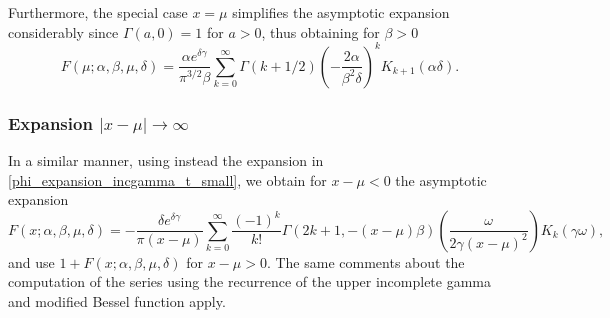 \documentclass[10pt,a4paper,oneside]{article}
\numberwithin{equation}{section}
\begin{document}
Furthermore, the special case $x=\mu$ simplifies the asymptotic expansion considerably since $\Gamma(a, 0) = 1$ for $a > 0$, thus obtaining for $\beta > 0$
\begin{equation}\label{expansion_x_eq_mu_large_delta}
F(\mu; \alpha, \beta, \mu, \delta) = \frac{\alpha e^{\delta \gamma}}{\pi^{3/2} \beta}\sum_{k=0}^{\infty}\Gamma(k + 1/2)\left(-\frac{2\alpha}{\beta^2 \delta}\right)^k K_{k+1}(\alpha \delta).
\end{equation}

\subsubsection{Expansion $|x-\mu| \to \infty$}

In a similar manner, using instead the expansion in \eqref{phi_expansion_incgamma_t_small}, we obtain for $x-\mu < 0$ the asymptotic expansion
\begin{equation}\label{general_asymptotic_xmu}
F(x; \alpha, \beta, \mu, \delta) = -\frac{\delta e^{\delta\gamma}}{\pi (x-\mu)}\sum_{k=0}^{\infty}\frac{(-1)^k}{k!}\Gamma(2k + 1, -(x-\mu)\beta) \left(\frac{\omega}{2\gamma (x-\mu)^2}\right) K_k(\gamma \omega),
\end{equation}
and use $1 + F(x; \alpha, \beta, \mu, \delta)$ for $x-\mu > 0$. The same comments about the computation of the series using the recurrence of the upper incomplete gamma and modified Bessel function apply.
\end{document}
